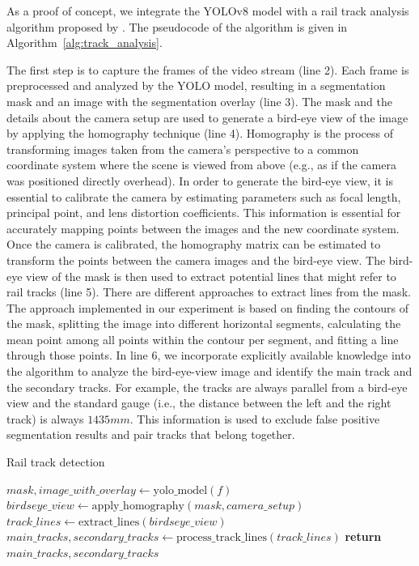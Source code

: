 \documentclass[Master,MDS,english]{BASE/twbook} %
\begin{document}
As a proof of concept, we integrate the YOLOv8 model with a rail track analysis algorithm proposed by \cite{danieles_algorithm}. The pseudocode of the algorithm is given in Algorithm~\ref{alg:track_analysis}.

The first step is to capture the frames of the video stream (line 2). Each frame is preprocessed and analyzed by the YOLO model, resulting in a segmentation mask and an image with the segmentation overlay (line 3). The mask and the details about the camera setup are used to generate a bird-eye view of the image by applying the homography technique (line 4). 
Homography is the process of transforming images taken from the camera's perspective to a common coordinate system where the scene is viewed from above (e.g., as if the camera was positioned directly overhead).
In order to generate the bird-eye view, it is essential to calibrate the camera by estimating parameters such as focal length, principal point, and lens distortion coefficients. This information is essential for accurately mapping points between the images and the new coordinate system. Once the camera is calibrated, the homography matrix can be estimated to transform the points between the camera images and the bird-eye view.
The bird-eye view of the mask is then used to extract potential lines that might refer to rail tracks (line 5). There are different approaches to extract lines from the mask. The approach implemented in our experiment is based on finding the contours of the mask, splitting the image into different horizontal segments, calculating the mean point among all points within the contour per segment, and fitting a line through those points. In line 6, we incorporate explicitly available knowledge into the algorithm to analyze the bird-eye-view image and identify the main track and the secondary tracks. For example, the tracks are always parallel from a bird-eye view and the standard gauge (i.e., the distance between the left and the right track) is always $1435mm$. This information is used to exclude false positive segmentation results and pair tracks that belong together.


\begin{algorithm}
\caption{Rail track detection}\label{alg:track_analysis}
\begin{algorithmic}[1]
\State $mask, image\_with\_overlay \gets \text{yolo\_model}(f)$
\State $birdseye\_view \gets \text{apply\_homography}(mask, camera\_setup)$
\State $track\_lines \gets \text{extract\_lines}(birdseye\_view)$
\State $main\_tracks, secondary\_tracks \gets \text{process\_track\_lines}(track\_lines)$
\EndWhile
\State \textbf{return} $main\_tracks, secondary\_tracks$ %
\EndProcedure
\end{algorithmic}
\end{algorithm}
\end{document}
